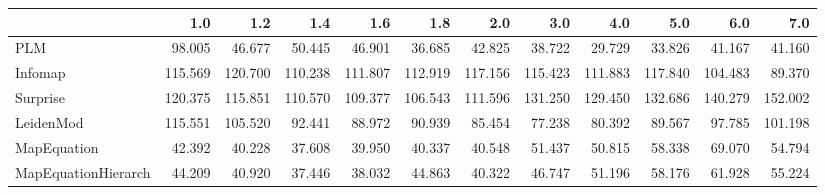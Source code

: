 \begin{tabular}{lrrrrrrrrrrr}
\toprule
{} &     1.0 &     1.2 &     1.4 &     1.6 &     1.8 &     2.0 &     3.0 &     4.0 &     5.0 &     6.0 &     7.0 \\
\midrule
PLM                 &  98.005 &  46.677 &  50.445 &  46.901 &  36.685 &  42.825 &  38.722 &  29.729 &  33.826 &  41.167 &  41.160 \\
Infomap             & 115.569 & 120.700 & 110.238 & 111.807 & 112.919 & 117.156 & 115.423 & 111.883 & 117.840 & 104.483 &  89.370 \\
Surprise            & 120.375 & 115.851 & 110.570 & 109.377 & 106.543 & 111.596 & 131.250 & 129.450 & 132.686 & 140.279 & 152.002 \\
LeidenMod           & 115.551 & 105.520 &  92.441 &  88.972 &  90.939 &  85.454 &  77.238 &  80.392 &  89.567 &  97.785 & 101.198 \\
MapEquation         &  42.392 &  40.228 &  37.608 &  39.950 &  40.337 &  40.548 &  51.437 &  50.815 &  58.338 &  69.070 &  54.794 \\
MapEquationHierarch &  44.209 &  40.920 &  37.446 &  38.032 &  44.863 &  40.322 &  46.747 &  51.196 &  58.176 &  61.928 &  55.224 \\
\bottomrule
\end{tabular}
